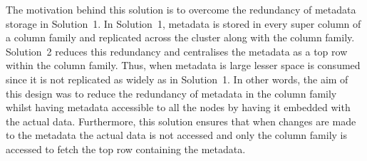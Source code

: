 The motivation behind this solution is to overcome the redundancy of metadata
storage in Solution~1.  In Solution~1,  metadata is stored in every super column
of a column family and replicated across the cluster along with the column
family.  Solution~2 reduces this redundancy and centralises the metadata as a top
row within the column family.  Thus,  when metadata is large lesser space is
consumed since it is not replicated as widely as in Solution~1. In other words, 
the aim of this design was to reduce the redundancy of metadata in the column
family whilst having metadata accessible to all the nodes by having it embedded
with the actual data. 
Furthermore,  this solution  ensures that when changes are made to the metadata
the actual data is not accessed and only the
column family  is accessed to fetch the top row containing the metadata. 










